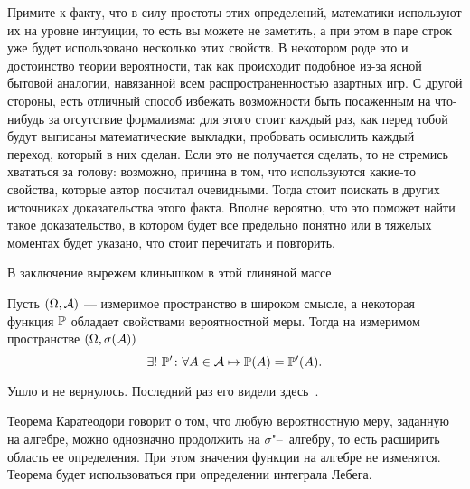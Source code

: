 \documentclass[../TV&MS.tex]{subfiles}
\begin{document}
Примите к факту, что в силу простоты этих определений, математики используют их на уровне
интуиции, то есть вы можете не заметить, а при этом в паре строк уже будет использовано 
несколько этих свойств. В некотором роде это и достоинство теории вероятности, так как
происходит подобное из-за ясной бытовой аналогии, навязанной всем распространенностью
азартных игр. С другой стороны, есть отличный способ избежать возможности быть
посаженным на что-нибудь за отсутствие формализма: для этого стоит каждый раз, как перед тобой
будут выписаны математические выкладки, пробовать осмыслить каждый переход, который
в них сделан. Если это не получается сделать, то не стремись хвататься за голову: возможно,
причина в том, что используются какие-то свойства, которые автор посчитал очевидными.
Тогда стоит поискать в других источниках доказательства этого факта. Вполне вероятно,
что это поможет найти такое доказательство, в котором будет все предельно понятно или 
в тяжелых моментах будет указано, что стоит перечитать и повторить.

В заключение вырежем клинышком в этой глиняной массе  

\begin{Th}[Каратеодори]\label{karateodori}
Пусть $(\Omega, \mathcal{A})$ --- измеримое пространство в широком смысле, 
а некоторая функция $\mathbb{P}$ обладает свойствами вероятностной меры. 
Тогда на измеримом пространстве $(\Omega, \sigma(\mathcal{A}))$
$$
	\exists !\  \mathbb{P}' \colon \forall A \in \mathcal{A} \mapsto \mathbb{P}(A) = \mathbb{P}'(A).
$$
\end{Th}
\begin{Proof}
	Ушло и не вернулось. Последний раз его видели здесь~\cite{Gusev}.
\end{Proof}

\begin{Why}
	Теорема Каратеодори говорит о том, что любую вероятностную меру, 
	заданную на алгебре, можно однозначно продолжить на $\sigma$"--~алгебру, то есть расширить 
	область ее определения. При этом значения функции на алгебре не изменятся. Теорема будет 
	использоваться при определении интеграла Лебега.
\end{Why}
\newpage
\end{document}
